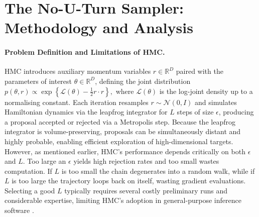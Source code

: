 \documentclass{article}
\begin{document}
\section{The No-U-Turn Sampler: Methodology and Analysis}

\paragraph{Problem Definition and Limitations of HMC.} HMC \cite{neal2011mcmc, duane1987hybrid} introduces auxiliary momentum variables $r \in \mathbb{R}^D$ paired with the parameters of interest $\theta \in \mathbb{R}^D$, defining the joint distribution
$p(\theta, r) \propto \exp\left\{\mathcal{L}(\theta) - \frac{1}{2} r \cdot r\right\},$
where $\mathcal{L}(\theta)$ is the log-joint density up to a normalising constant. Each iteration resamples $r \sim \mathcal{N}(0, I)$ and simulates Hamiltonian dynamics via the leapfrog integrator for $L$ steps of size $\epsilon$, producing a proposal accepted or rejected via a Metropolis step. Because the leapfrog integrator is volume-preserving, proposals can be simultaneously distant and highly probable, enabling efficient exploration of high-dimensional targets.\\
However, as mentioned earlier, HMC's performance depends critically on both $\epsilon$ and $L$. Too large an $\epsilon$ yields high rejection rates and too small wastes computation. If $L$ is too small the chain degenerates into a random walk, while if $L$ is too large the trajectory loops back on itself, wasting gradient evaluations. Selecting a good $L$ typically requires several costly preliminary runs and considerable expertise, limiting HMC's adoption in general-purpose inference software \cite{main}.
\end{document}
